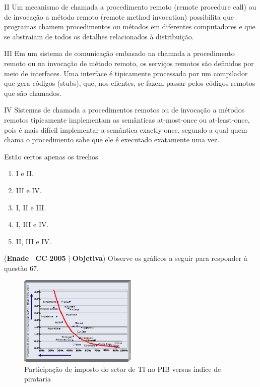 \documentclass{exam}
\begin{document}
\begin{questions}
II Um mecanismo de chamada a procedimento remoto (remote
procedure call) ou de invocação a método remoto (remote
method invocation) possibilita que programas chamem
procedimentos ou métodos em diferentes computadores e
que se abstraiam de todos os detalhes relacionados à
distribuição.

III Em um sistema de comunicação embasado na chamada a
procedimento remoto ou na invocação de método remoto, os
serviços remotos são definidos por meio de interfaces. Uma
interface é tipicamente processada por um compilador que
gera códigos (stubs), que, nos clientes, se fazem passar pelos
códigos remotos que são chamados.

IV Sistemas de chamada a procedimentos remotos ou de
invocação a métodos remotos tipicamente implementam as
semânticas at-most-once ou at-least-once, pois é mais difícil
implementar a semântica exactly-once, segundo a qual quem
chama o procedimento sabe que ele é executado exatamente
uma vez.

Estão certos apenas os trechos
	\begin{enumerate}[label=\alph*)]
		\item  I e II.
		\item  III e IV.
		\item  I, II e III.
		\item  I, III e IV.
		\item  II, III e IV.
	\end{enumerate}

\question (\textbf{Enade} $|$ \textbf{CC}-\textbf{2005} $|$ \textbf{Objetiva})
Observe os gráficos a seguir para responder à questão 67.

\begin{figure}[H]
	\begin{center}
		\includegraphics[width=0.5\textwidth]{CIENCIA_DA_COMPUTACAO_Prova2005-utf8_figuras/fig-0033.jpg}
		\caption{Participação de imposto do setor de TI no PIB versus índice de pirataria}
	\end{center}
\end{figure}


\end{questions}
\end{document}
